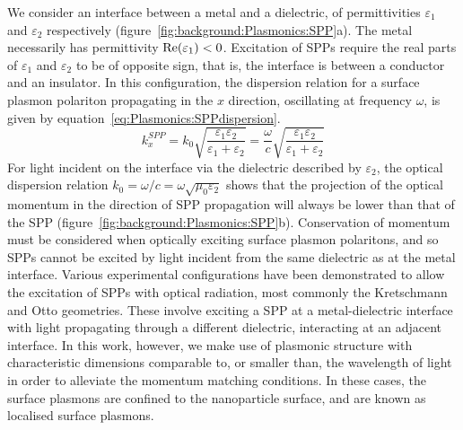 We consider an interface between a metal and a dielectric, of permittivities $\varepsilon_1$ and $\varepsilon_2$ respectively (figure~\ref{fig:background:Plasmonics:SPP}a). The metal necessarily has permittivity ${\mathop{\rm Re}\nolimits}(\varepsilon_1)<0$. Excitation of SPPs require the real parts of $\varepsilon_1$ and $\varepsilon_2$ to be of opposite sign, that is, the interface is between a conductor and an insulator. In this configuration, the dispersion relation for a surface plasmon polariton propagating in the $x$ direction, oscillating at frequency $\omega$, is given by equation~\ref{eq:Plasmonics:SPPdispersion}. 
\begin{equation}\label{eq:Plasmonics:SPPdispersion}
    k^{SPP}_{x} = k_0 \sqrt{\frac{\varepsilon_{1}\varepsilon_{2}}{\varepsilon_{1}+\varepsilon_{2}}} = \frac{\omega}{c} \sqrt{\frac{\varepsilon_{1}\varepsilon_{2}}{\varepsilon_{1}+\varepsilon_{2}}}
\end{equation}
For light incident on the interface via the dielectric described by $\varepsilon_2$, the optical dispersion relation $k_0 = \omega / c = \omega \sqrt{\mu_0 \varepsilon_2}$ shows that the projection of the optical momentum in the direction of SPP propagation will always be lower than that of the SPP (figure~\ref{fig:background:Plasmonics:SPP}b). Conservation of momentum must be considered when optically exciting surface plasmon polaritons, and so SPPs cannot be excited by light incident from the same dielectric as at the metal interface. Various experimental configurations have been demonstrated to allow the excitation of SPPs with optical radiation, most commonly the Kretschmann and Otto geometries. These involve exciting a SPP at a metal-dielectric interface with light propagating through a different dielectric, interacting at an adjacent interface. In this work, however, we make use of plasmonic structure with characteristic dimensions comparable to, or smaller than, the wavelength of light in order to alleviate the momentum matching conditions. In these cases, the surface plasmons are confined to the nanoparticle surface, and are known as localised surface plasmons.


